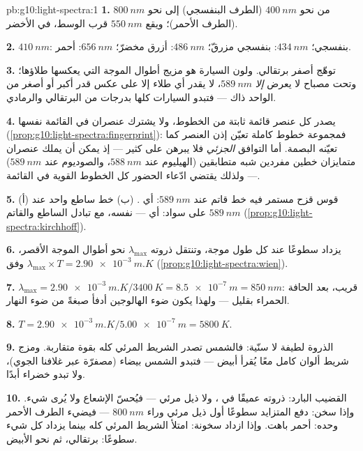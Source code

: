 \begin{solution}{pb:g10:light-spectra:1}
\textbf{1.} من نحو $\qty{400}{nm}$ (الطرف البنفسجي) إلى نحو
$\qty{800}{nm}$ (الطرف الأحمر)؛ ويقع $\qty{550}{nm}$ قرب الوسط، في
الأخضر.

\textbf{2.} $\qty{410}{nm}$: بنفسجي؛ $\qty{434}{nm}$: بنفسجي مزرقّ؛
$\qty{486}{nm}$: أزرق مخضرّ؛ $\qty{656}{nm}$: أحمر.

\textbf{3.} توهّج  أصفر برتقالي. ولون السيارة هو
مزيج أطوال الموجة التي يعكسها طلاؤها؛ وتحت مصباح لا يعرض
\emph{إلا} $\qty{589}{nm}$، لا يقدر أي طلاء إلا على عكس قدر أكبر أو أصغر
من  الواحد ذاك --- فتبدو السيارات كلها بدرجات من البرتقالي
والرمادي.

\textbf{4.} يصدر كل عنصر قائمة ثابتة من الخطوط، ولا يشترك عنصران
في القائمة نفسها
(\cref{prop:g10:light-spectra:fingerprint}): فمجموعة خطوط كاملة
تعيّن إذن العنصر كما تعيّنه البصمة. أما التوافق
\emph{الجزئي} فلا يبرهن على كثير --- إذ يمكن أن يملك عنصران متمايزان
خطين مفردين شبه متطابقين (الهيليوم عند $\qty{588}{nm}$، والصوديوم عند
$\qty{589}{nm}$) --- ولذلك يقتضي ادّعاء الحضور كل الخطوط القوية
في القائمة.

\textbf{5.} (أ) قوس قزح مستمر فيه خط قاتم عند
$\qty{589}{nm}$: أي . (ب) خط ساطع واحد عند
$\qty{589}{nm}$ على سواد: أي  ---  نفسه،
مع تبادل الساطع والقاتم
(\cref{prop:g10:light-spectra:kirchhoff}).

\textbf{6.} يزداد  سطوعًا عند كل طول موجة، وتنتقل ذروته
$\lambda_{\max}$ نحو أطوال الموجة الأقصر، وفق
$\lambda_{\max} \times T = \qty{2.90e-3}{m.K}$
(\cref{prop:g10:light-spectra:wien}).

\textbf{7.} $\lambda_{\max} = \qty{2.90e-3}{m.K} / \qty{3400}{K}
= \qty{8.5e-7}{m} = \qty{850}{nm}$:  قريب، بعد الحافة الحمراء
بقليل --- ولهذا يكون ضوء الهالوجين أدفأ صبغةً من ضوء النهار.

\textbf{8.} $T = \qty{2.90e-3}{m.K} / \qty{5.00e-7}{m} = \qty{5800}{K}$.

\textbf{9.} الذروة لطيفة لا سنّية: فالشمس تصدر الشريط المرئي
كله بقوة متقاربة. ومزج شريط ألوان كامل معًا
يُقرأ أبيض --- فتبدو الشمس بيضاء (مصفرّة عبر غلافنا
الجوي)، ولا تبدو خضراء أبدًا.

\textbf{10.} القضيب البارد: ذروته عميقًا في ، ولا ذيل مرئي ---
فيُحسّ الإشعاع ولا يُرى شيء. وإذا سخن: دفع  المتزايد سطوعًا
أول ذيل مرئي وراء $\qty{800}{nm}$ --- فيضيء الطرف الأحمر
وحده: أحمر باهت. وإذا ازداد سخونة: امتلأ الشريط المرئي كله بينما
يزداد كل شيء سطوعًا: برتقالي، ثم نحو الأبيض.


\end{solution}
